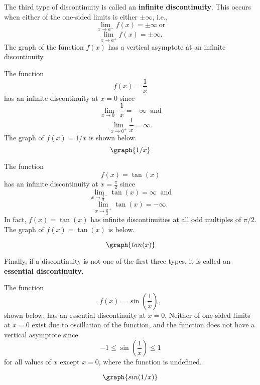 \documentclass[handout]{ximera}
\begin{document}
The third type of discontinuity is called an \textbf{infinite discontinuity}. 
This occurs when either of the one-sided limits is either $\pm \infty$, i.e., 
\[\lim_{x \to a^-} f(x) = \pm\infty \ \text{or}  \]
\[\lim_{x \to a^+} f(x) = \pm\infty. \]
The graph of the function $f(x)$ has a vertical asymptote at an infinite discontinuity.


\begin{example}[example 5]
The function 
\[
f(x) = \frac{1}{x}
\]
  has an infinite discontinuity at $x=0$ since
\[\lim_{x \to 0^-} \frac{1}{x} = -\infty \ \text {  and}\]
\[\lim_{x \to 0^+} \frac{1}{x} = \infty.\]
The graph of $f(x) = 1/x$ is shown below.
\[
\graph{1/x}
\]
\end{example}


\begin{example}[example 6]
The function 
\[
f(x) = \tan(x)
\]
 has an infinite discontinuity at $x = \frac{\pi}{2}$
since
\[\lim_{x \to \frac{\pi}{2}^-} \tan(x) = \infty \ \text {  and}\]
\[\lim_{x \to \frac{\pi}{2}^+} \tan(x) = -\infty.\]
In fact, $f(x) = \tan(x)$ has infinite discontinuities at all odd multiples of $\pi/2$. 
The graph of $f(x) = \tan(x)$ is below.

\[
\graph{tan(x)}
\]

\end{example}


Finally, if a discontinuity is not one of the first three types, it is called an 
\textbf{essential discontinuity}.


\begin{example}[example 7] The function 
\[
f(x) = \sin \left(\frac{1}{x}\right),
\]
 shown below, has an essential discontinuity at $x = 0$.
Neither of one-sided limits at $x=0$ exist due to oscillation of the function, 
and the function does not have a vertical asymptote since 
\[-1 \leq \sin\left(\frac{1}{x}\right) \leq 1 \]
for all values of $x$ except $x = 0$, where the function is undefined.

\[
\graph{sin(1/x)}
\]
\end{example}


\end{document}
